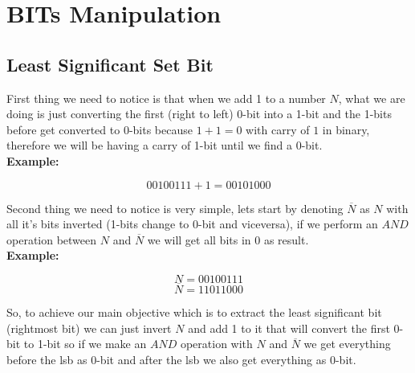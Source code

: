 \documentclass[twoside]{article}
\newcommand{\fileTitleStyle}{\centering\underline}
\begin{document}

\thispagestyle{empty}
\cleardoublepage
\tableofcontents
\newpage
\thispagestyle{empty}
\cleardoublepage
\begin{multicols*}{2}
\end{multicols*}
\newpage
\sectionfont{\centering\bfseries\Huge}
\vspace{1em}
\section*{BITs Manipulation}
\vspace{3em}
\subsectionfont{\bfseries\LARGE}
\subsectionfont{\fileTitleStyle}
\subsection*{Least Significant Set Bit}
\vspace{1em}
\sffamily
\bgroup

First thing we need to notice is that when we add 1 to a number $N$, what we are doing is just converting the first (right to left) 0-bit into a 1-bit and
the 1-bits before get converted to 0-bits because $1 + 1 = 0$ with carry of $1$ in binary, therefore we will be having a carry of 1-bit until we find a 0-bit.\\

\textbf{Example:}

$$00100111 + 1 = 00101000$$

Second thing we need to notice is very simple, lets start by denoting $\overline{N}$ as $N$ with all it's bits inverted (1-bits change to 0-bit and viceversa), if we perform an $AND$ operation between $N$ and $\overline{N}$ we will get all bits in $0$ as result.\\

\textbf{Example:}

$$N = 00100111$$
$$\overline{N} = 11011000$$

So, to achieve our main objective which is to extract the least significant bit (rightmost bit) we can just invert $N$ and add 1 to it that will convert the first 0-bit to 1-bit so if we make an $AND$ operation with $N$ and $\overline{N}$ we get everything before the lsb as 0-bit and after the lsb we also get everything as 0-bit.\\
\end{document}
